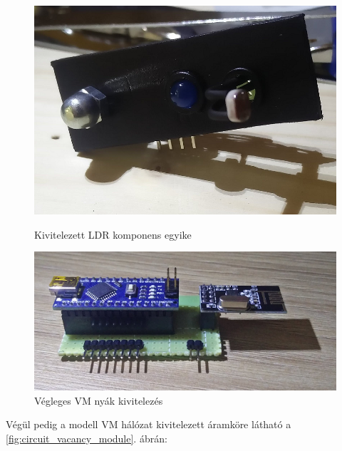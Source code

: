 \documentclass[a4paper,12pt]{article}
\begin{document}
\begin{figure}[htp]
	\centering
	\begin{minipage}{0.5\textwidth}
		\centering
		\includegraphics[width=0.8\linewidth]{images/VMLDRelement.png}
		\caption[Egy LDR komponens]{Kivitelezett LDR komponens egyike}
		\label{fig:VMLDRelement}
	\end{minipage}\hfill
	\begin{minipage}{0.45\textwidth}
		\centering
		\includegraphics[width=\linewidth]{images/VMDMBCRFT.png}
		\caption[VM implementáció]{Végleges VM nyák kivitelezés}
		\label{fig:VMDMBCRFT}
	\end{minipage}
\end{figure}


Végül pedig a modell VM hálózat kivitelezett áramköre látható a \ref{fig:circuit_vacancy_module}. ábrán:
\end{document}
